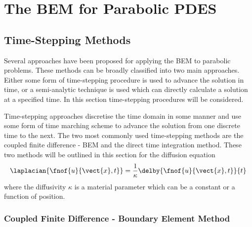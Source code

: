 \chapter{The BEM for Parabolic PDES}

\section{Time-Stepping Methods}

Several approaches have been proposed for applying the BEM to parabolic
problems.  These methods can be broadly classified into two main approaches.
Either some form of time-stepping procedure is used to advance the solution
in time, or a semi-analytic technique is used which can directly calculate
a solution at a specified time. In this section time-stepping procedures
will be considered.

Time-stepping approaches discretise the time domain in some manner and use
some form of time marching scheme to advance the solution from one discrete
time to the next.  The two most commonly used time-stepping methods are the
coupled finite difference - BEM and the direct time integration method.
These two methods will be outlined in this section for the diffusion
equation 
\begin{equation}
  \laplacian{\fnof{u}{\vect{x},t}} = \dfrac{1}{\kappa}
  \delby{\fnof{u}{\vect{x},t}}{t}
\end{equation}
where the diffusivity $\kappa$ is a material parameter which can be a
constant or a function of position.

\subsection{Coupled Finite Difference - Boundary Element Method}
\label{sec:fdbem}

